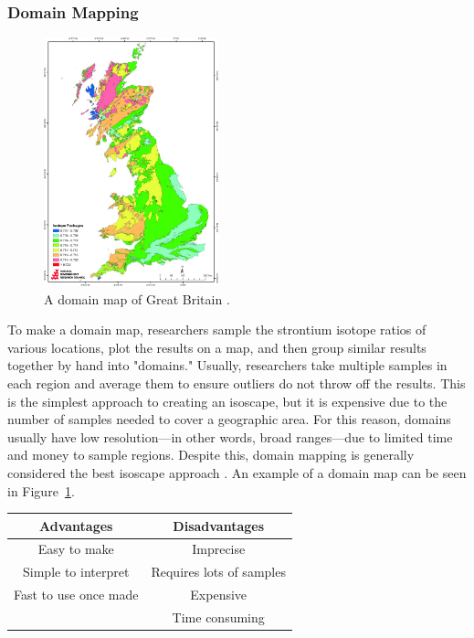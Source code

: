 \documentclass[a4paper, 12pt]{article}
\begin{document}
\subsubsection{Domain Mapping}
\begin{figure}[htbp]
    \centering
    \includegraphics[width=0.45\textwidth]{domain_mapping.jpg}
    \caption{A domain map of Great Britain \citep{evans2010}.}
    \label{fig:domain_mapping}
\end{figure}
To make a domain map, researchers sample the strontium isotope ratios of
various locations, plot the results on a map, and then group similar results
together by hand into "domains." Usually, researchers take multiple samples
in each region and average them to ensure outliers do not throw off the results.
This is the simplest approach to creating an isoscape, but it is expensive due to the number
of samples needed to cover a geographic area. For this reason,
domains usually have low resolution—in other words, broad ranges—due to
limited time and money to sample regions.
Despite this, domain mapping is generally considered the best isoscape approach \citep{holt2021}.
An example of a domain map can be seen in Figure~\ref{fig:domain_mapping}.


\begin{center}
    \begin{tabular}{||c | c||}
        \hline
        Advantages            & Disadvantages            \\ [0.5ex]
        \hline\hline
        Easy to make          & Imprecise                \\
        \hline
        Simple to interpret   & Requires lots of samples \\
        \hline
        Fast to use once made & Expensive                \\
        \hline
                              & Time consuming           \\ [1ex]
        \hline
    \end{tabular}
\end{center}
\end{document}
